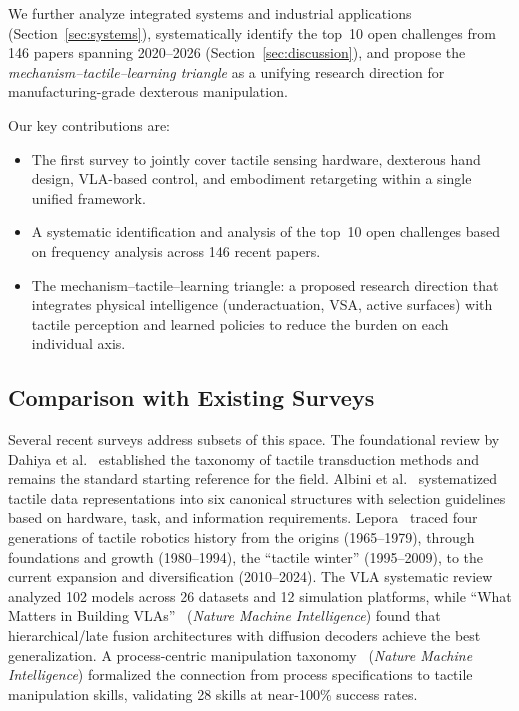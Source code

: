 We further analyze integrated systems and industrial applications (Section~\ref{sec:systems}), systematically identify the top~10 open challenges from 146 papers spanning 2020--2026 (Section~\ref{sec:discussion}), and propose the \emph{mechanism--tactile--learning triangle} as a unifying research direction for manufacturing-grade dexterous manipulation.

Our key contributions are:
\begin{itemize}
    \item The first survey to jointly cover tactile sensing hardware, dexterous hand design, VLA-based control, and embodiment retargeting within a single unified framework.
    \item A systematic identification and analysis of the top~10 open challenges based on frequency analysis across 146 recent papers.
    \item The mechanism--tactile--learning triangle: a proposed research direction that integrates physical intelligence (underactuation, VSA, active surfaces) with tactile perception and learned policies to reduce the burden on each individual axis.
\end{itemize}

\subsection{Comparison with Existing Surveys}

Several recent surveys address subsets of this space. The foundational review by Dahiya et al.~\cite{dahiya2010tactile} established the taxonomy of tactile transduction methods and remains the standard starting reference for the field. Albini et al.~\cite{albini2025representing} systematized tactile data representations into six canonical structures with selection guidelines based on hardware, task, and information requirements. Lepora~\cite{lepora2025past} traced four generations of tactile robotics history from the origins (1965--1979), through foundations and growth (1980--1994), the ``tactile winter'' (1995--2009), to the current expansion and diversification (2010--2024). The VLA systematic review~\cite{various2026vla} analyzed 102 models across 26 datasets and 12 simulation platforms, while ``What Matters in Building VLAs''~\cite{various2025whatmatters} (\emph{Nature Machine Intelligence}) found that hierarchical/late fusion architectures with diffusion decoders achieve the best generalization. A process-centric manipulation taxonomy~\cite{various2025taxonomy} (\emph{Nature Machine Intelligence}) formalized the connection from process specifications to tactile manipulation skills, validating 28 skills at near-100\% success rates.

